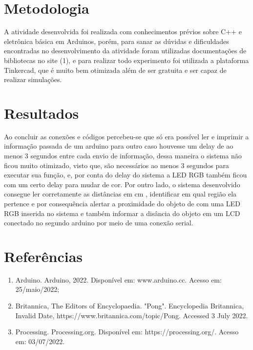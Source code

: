 \documentclass[conference]{IEEEtran}
\begin{document}
\section{Metodologia}
 A atividade desenvolvida foi realizada com conhecimentos prévios sobre C++ e eletrônica básica em Arduinos, porém, para sanar as dúvidas e dificuldades encontradas no
 desenvolvimento da atividade foram utilizadas documentações de bibliotecas no site (1), e para realizar todo experimento foi utilizada a plataforma Tinkercad, que é
 muito bem otimizada além de ser gratuita e ser capaz de realizar simulações.

\section{Resultados}
 Ao concluir as conexões e códigos percebeu-se que só era possível ler e imprimir a informação passada de um arduino para outro caso houvesse um delay de ao menos 3 segundos
 entre cada envio de informação, dessa maneira o sistema não ficou muito otimizado, visto que, são necessários ao menos 3 segundos para executar sua função, e, por conta
 do delay do sistema a LED RGB também ficou com um certo delay para mudar de cor. Por outro lado, o sistema desenvolvido consegue ler corretamente as distâncias em cm 
 , identificar em qual região ela pertence e por consequência alertar a proximidade do objeto de com uma LED RGB inserida no sistema e também informar a disância do objeto
 em um LCD conectado no segundo arduino por meio de uma conexão serial.

\section*{Referências}

\begin{enumerate}
    \item Arduino. Arduino, 2022. Disponível em: www.arduino.cc. Acesso em: 25/maio/2022;
    \item Britannica, The Editors of Encyclopaedia. "Pong". Encyclopedia Britannica, Invalid Date, https://www.britannica.com/topic/Pong. Accessed 3 July 2022.
    \item Processing. Processing.org. Disponível em: https://processing.org/. Acesso em: 03/07/2022.
\end{enumerate}
\end{document}
